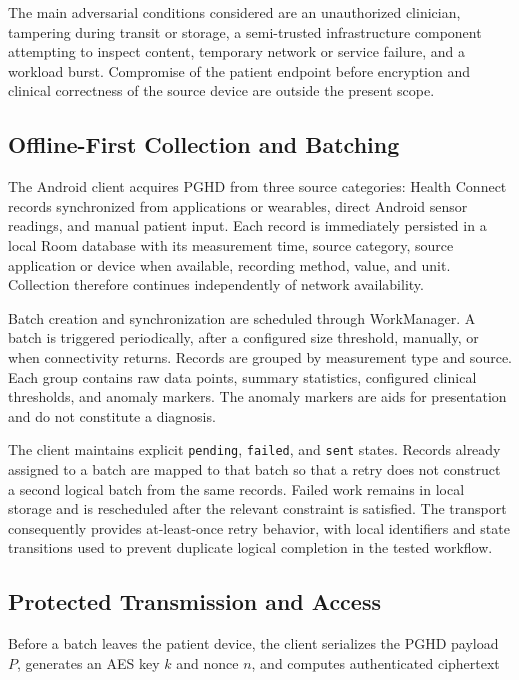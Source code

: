 The main adversarial conditions considered are an unauthorized clinician, tampering during transit or storage, a semi-trusted infrastructure component attempting to inspect content, temporary network or service failure, and a workload burst.
Compromise of the patient endpoint before encryption and clinical correctness of the source device are outside the present scope.

\subsection{Offline-First Collection and Batching}

The Android client acquires PGHD from three source categories: Health Connect records synchronized from applications or wearables, direct Android sensor readings, and manual patient input.
Each record is immediately persisted in a local Room database with its measurement time, source category, source application or device when available, recording method, value, and unit.
Collection therefore continues independently of network availability.

Batch creation and synchronization are scheduled through WorkManager.
A batch is triggered periodically, after a configured size threshold, manually, or when connectivity returns.
Records are grouped by measurement type and source.
Each group contains raw data points, summary statistics, configured clinical thresholds, and anomaly markers.
The anomaly markers are aids for presentation and do not constitute a diagnosis.

The client maintains explicit \texttt{pending}, \texttt{failed}, and \texttt{sent} states.
Records already assigned to a batch are mapped to that batch so that a retry does not construct a second logical batch from the same records.
Failed work remains in local storage and is rescheduled after the relevant constraint is satisfied.
The transport consequently provides at-least-once retry behavior, with local identifiers and state transitions used to prevent duplicate logical completion in the tested workflow.

\subsection{Protected Transmission and Access}

Before a batch leaves the patient device, the client serializes the PGHD payload \(P\), generates an AES key \(k\) and nonce \(n\), and computes authenticated ciphertext

